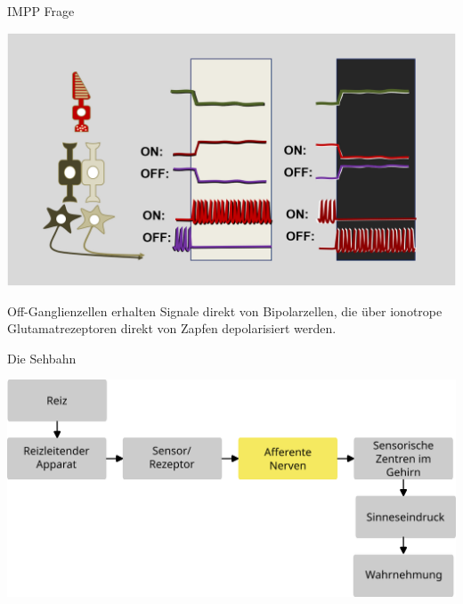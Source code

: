 \documentclass{beamer}
\begin{document}
\begin{frame}{IMPP Frage}
\begin{center}
    \includegraphics[width=\textwidth]{on_off_bipolarzellen.png}
\end{center}

Off-Ganglienzellen erhalten Signale direkt von Bipolarzellen, die  über ionotrope Glutamatrezeptoren direkt von Zapfen depolarisiert werden.

\end{frame}




\begin{frame}{Die Sehbahn}

\begin{cener}
\includegraphics[width=\textwidth]{wahrnehmungsprozess_ohne_beispiel_bahnen.png}
\end{cener}

\end{frame}
\end{document}
